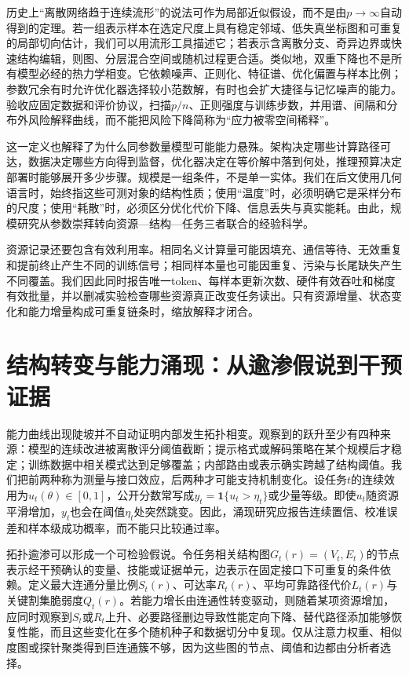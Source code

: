 历史上“离散网络趋于连续流形”的说法可作为局部近似假设，而不是由$p\to\infty$自动得到的定理。若一组表示样本在选定尺度上具有稳定邻域、低失真坐标图和可重复的局部切向估计，我们可以用流形工具描述它；若表示含离散分支、奇异边界或快速结构编辑，则图、分层混合空间或随机过程更合适。类似地，双重下降也不是所有模型必经的热力学相变。它依赖噪声、正则化、特征谱、优化偏置与样本比例；参数冗余有时允许优化器选择较小范数解，有时也会扩大捷径与记忆噪声的能力。验收应固定数据和评价协议，扫描$p/n$、正则强度与训练步数，并用谱、间隔和分布外风险解释曲线，而不能把风险下降简称为“应力被零空间稀释”。

这一定义也解释了为什么同参数量模型可能能力悬殊。架构决定哪些计算路径可达，数据决定哪些方向得到监督，优化器决定在等价解中落到何处，推理预算决定部署时能够展开多少步骤。规模是一组条件，不是单一实体。我们在后文使用几何语言时，始终指这些可测对象的结构性质；使用“温度”时，必须明确它是采样分布的尺度；使用“耗散”时，必须区分优化代价下降、信息丢失与真实能耗。由此，规模研究从参数崇拜转向资源—结构—任务三者联合的经验科学。

资源记录还要包含有效利用率。相同名义计算量可能因填充、通信等待、无效重复和提前终止产生不同的训练信号；相同样本量也可能因重复、污染与长尾缺失产生不同覆盖。我们因此同时报告唯一token、每样本更新次数、硬件有效吞吐和梯度有效批量，并以删减实验检查哪些资源真正改变任务读出。只有资源增量、状态变化和能力增量构成可重复链条时，缩放解释才闭合。

\section{结构转变与能力涌现：从逾渗假说到干预证据}
\label{sec:topological_percolation_emergence}
\label{sec:scaling_law_unified_equation}

能力曲线出现陡坡并不自动证明内部发生拓扑相变。观察到的跃升至少有四种来源：模型的连续改进被离散评分阈值截断；提示格式或解码策略在某个规模后才稳定；训练数据中相关模式达到足够覆盖；内部路由或表示确实跨越了结构阈值。我们把前两种称为测量与接口效应，后两种才可能支持机制变化。设任务$t$的连续效用为$u_t(\theta)\in[0,1]$，公开分数常写成$y_t=\mathbf{1}\{u_t>\eta_t\}$或少量等级。即使$u_t$随资源平滑增加，$y_t$也会在阈值$\eta_t$处突然跳变。因此，涌现研究应报告连续置信、校准误差和样本级成功概率，而不能只比较通过率。

拓扑逾渗可以形成一个可检验假说。令任务相关结构图$G_t(r)=(V_t,E_t)$的节点表示经干预确认的变量、技能或证据单元，边表示在固定接口下可重复的条件依赖。定义最大连通分量比例$S_t(r)$、可达率$R_t(r)$、平均可靠路径代价$L_t(r)$与关键割集脆弱度$Q_t(r)$。若能力增长由连通性转变驱动，则随着某项资源增加，应同时观察到$S_t$或$R_t$上升、必要路径删边导致性能定向下降、替代路径添加能够恢复性能，而且这些变化在多个随机种子和数据切分中复现。仅从注意力权重、相似度图或探针聚类得到巨连通簇不够，因为这些图的节点、阈值和边都由分析者选择。

